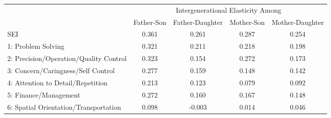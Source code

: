 
\begin{tabular}{lcccc}
\toprule
\multicolumn{1}{c}{ } & \multicolumn{4}{c}{Intergenerational Elasticity Among} \\
\cmidrule(l{3pt}r{3pt}){2-5}
 & Father-Son & Father-Daughter & Mother-Son & Mother-Daughter\\
\midrule
SEI & 0.361\newline[0.355, 0.368] & 0.261\newline[0.255, 0.268] & 0.287\newline[0.272, 0.302] & 0.254\newline[0.241, 0.267]\\
1: Problem Solving & 0.321\newline[0.315, 0.328] & 0.211\newline[0.204, 0.218] & 0.218\newline[0.202, 0.233] & 0.198\newline[0.185, 0.212]\\
2: Precision/Operation/Quality Control & 0.323\newline[0.316, 0.330] & 0.154\newline[0.148, 0.160] & 0.272\newline[0.255, 0.290] & 0.173\newline[0.161, 0.185]\\
3: Concern/Caringness/Self Control & 0.277\newline[0.271, 0.283] & 0.159\newline[0.152, 0.166] & 0.148\newline[0.135, 0.161] & 0.142\newline[0.129, 0.154]\\
4: Attention to Detail/Repetition & 0.213\newline[0.208, 0.219] & 0.123\newline[0.115, 0.132] & 0.079\newline[0.067, 0.090] & 0.092\newline[0.079, 0.106]\\
5: Finance/Management & 0.272\newline[0.265, 0.279] & 0.160\newline[0.153, 0.168] & 0.167\newline[0.151, 0.183] & 0.148\newline[0.134, 0.161]\\
6: Spatial Orientation/Transportation & 0.098\newline[0.091, 0.105] & -0.003\newline[-0.010, 0.004] & 0.014\newline[-0.003, 0.030] & 0.046\newline[0.032, 0.060]\\

\end{tabular}
